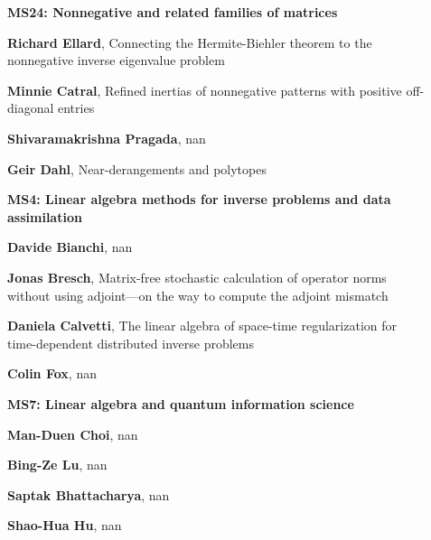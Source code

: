 \documentclass[ILAS2025-program.tex]{subfiles}
\begin{document}
\begin{description}
    \begin{description}
    \item[] {\color{mstitle}\textbf{MS24: Nonnegative and related families of matrices}} 
    \item[] \textbf{Richard Ellard}, Connecting the Hermite-Biehler theorem to the nonnegative inverse eigenvalue problem
        \item[] \textbf{Minnie Catral}, Refined inertias of nonnegative patterns with positive off-diagonal entries
        \item[] \textbf{Shivaramakrishna Pragada}, nan
        \item[] \textbf{Geir Dahl}, Near-derangements and polytopes
        \end{description}
    \begin{description}
    \item[] {\color{mstitle}\textbf{MS4: Linear algebra methods for inverse problems and data assimilation}} 
    \item[] \textbf{Davide Bianchi}, nan
        \item[] \textbf{Jonas Bresch}, Matrix-free stochastic calculation of operator norms without using adjoint---on the way to compute the adjoint mismatch
        \item[] \textbf{Daniela Calvetti}, The linear algebra of space-time regularization for time-dependent distributed inverse problems
        \item[] \textbf{Colin Fox}, nan
        \end{description}
    \begin{description}
    \item[] {\color{mstitle}\textbf{MS7: Linear algebra and quantum information science}} 
    \item[] \textbf{Man-Duen Choi}, nan
        \item[] \textbf{Bing-Ze Lu}, nan
        \item[] \textbf{Saptak Bhattacharya}, nan
        \item[] \textbf{Shao-Hua Hu}, nan
        \end{description}
    \begin{description}

\end{description}
\end{description}
\end{document}
